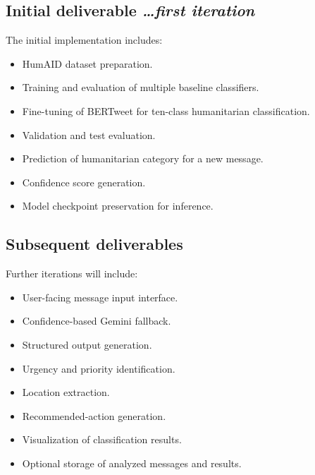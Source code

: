 \documentclass[11pt,a4paper]{article}
\newcommand{\BvrHint}[1]{%
  {\normalfont\normalsize\itshape\hfill #1}}
\begin{document}
\subsection{Initial deliverable %
\BvrHint{\ldots first iteration}}

The initial implementation includes:

\begin{itemize}[leftmargin=0.7cm]

    \item HumAID dataset preparation.

    \item Training and evaluation of multiple baseline classifiers.

    \item Fine-tuning of BERTweet for ten-class humanitarian classification.

    \item Validation and test evaluation.

    \item Prediction of humanitarian category for a new message.

    \item Confidence score generation.

    \item Model checkpoint preservation for inference.

\end{itemize}

\subsection{Subsequent deliverables}

Further iterations will include:

\begin{itemize}[leftmargin=0.7cm]

    \item User-facing message input interface.

    \item Confidence-based Gemini fallback.

    \item Structured output generation.

    \item Urgency and priority identification.

    \item Location extraction.

    \item Recommended-action generation.

    \item Visualization of classification results.

    \item Optional storage of analyzed messages and results.

\end{itemize}
\end{document}
